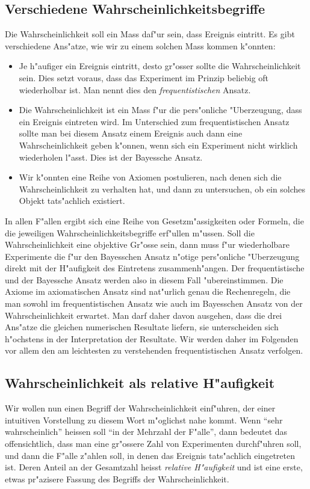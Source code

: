 \subsection{Verschiedene Wahrscheinlichkeitsbegriffe}
Die Wahrscheinlichkeit soll ein Mass daf"ur sein, dass Ereignis
eintritt.
Es gibt verschiedene Ans"atze, wie wir zu einem solchen Mass kommen
k"onnten:
\begin{itemize}
\item 
Je h"aufiger ein Ereignis eintritt, desto gr"osser sollte die
Wahrscheinlichkeit sein. 
Dies setzt voraus, dass das Experiment im Prinzip beliebig oft wiederholbar 
ist.
Man nennt dies den {\em frequentistischen} Ansatz.
\item
Die Wahrscheinlichkeit ist ein Mass f"ur die pers"onliche
"Uberzeugung, dass ein Ereignis eintreten wird.
Im Unterschied zum frequentistischen Ansatz sollte man bei diesem
Ansatz einem Ereignis auch dann eine Wahrscheinlichkeit geben k"onnen,
wenn sich ein Experiment nicht wirklich wiederholen l"asst.
Dies ist der Bayessche Ansatz.
\item
Wir k"onnten eine Reihe von Axiomen postulieren, nach denen sich
die Wahrscheinlichkeit zu verhalten hat, und dann zu untersuchen,
ob ein solches Objekt tats"achlich existiert.
\end{itemize}
In allen F"allen ergibt sich eine Reihe von Gesetzm"assigkeiten
oder Formeln, die die jeweiligen Wahrscheinlichkeitsbegriffe 
erf"ullen m"ussen.
Soll die Wahrscheinlichkeit eine objektive Gr"osse sein, dann
muss f"ur wiederholbare Experimente die f"ur den Bayesschen
Ansatz n"otige pers"onliche "Uberzeugung direkt mit der H"aufigkeit
des Eintretens zusammenh"angen.
Der frequentistische und der Bayessche Ansatz werden also in diesem
Fall "ubereinstimmen.
Die Axiome im axiomatischen Ansatz sind nat"urlich genau die
Rechenregeln, die man sowohl im frequentistischen Ansatz wie
auch im Bayesschen Ansatz von der Wahrscheinlichkeit erwartet.
Man darf daher davon ausgehen, dass die drei Ans"atze die gleichen numerischen
Resultate liefern, sie unterscheiden sich h"ochstens in der Interpretation
der Resultate.
Wir werden daher im Folgenden vor allem den am leichtesten zu
verstehenden frequentistischen Ansatz verfolgen.

\subsection{Wahrscheinlichkeit als relative H"aufigkeit}
Wir wollen nun einen Begriff der Wahrscheinlichkeit einf"uhren, der
einer intuitiven Vorstellung zu diesem Wort m"oglichst nahe kommt.
Wenn ``sehr
wahrscheinlich'' heissen soll ``in der Mehrzahl der F"alle'', dann
bedeutet das offensichtlich, dass man eine gr"ossere Zahl von
Experimenten durchf"uhren soll, und dann die F"alle z"ahlen soll,
in denen das Ereignis tats"achlich eingetreten ist. Deren Anteil
an der Gesamtzahl heisst {\em relative H"aufigkeit} und ist eine erste,
etwas pr"azisere Fassung des Begriffs der Wahrscheinlichkeit. 

